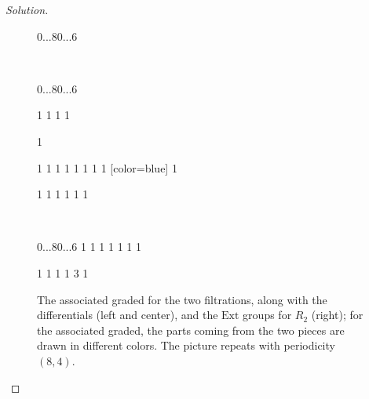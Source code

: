 \documentclass{amsart}
\newcommand{\Ext}{\mathrm{Ext}}
\begin{document}
\begin{proof}[Solution]
\begin{figure}
\begin{sseq}[entrysize=5mm, gridstroke=.05pt]{0...8}{0...6}
\ssdropbull {}\ssarrowhead
{}
\ssdropbull {}\ssarrowhead

\end{sseq}\
\begin{sseq}[entrysize=5mm, gridstroke=.05pt,ylabels=none]{0...8}{0...6}

  \ssdropbull
   1
  \ssdropbull \ssstroke[color=red]
  \ssmove 1 1
  \ssdropbull \ssstroke[color=red]
  \ssdropbull \ssstroke[color=red]
   1
  \ssdropbull {} \ssstroke[color=red]
  \ssmove 1 1
  \ssdropbull \ssstroke[color=red]

  \ssdropbull
   1
  \ssdropbull \ssstroke[color=red]

  \ssdropbull 
   1
  \ssdropbull \ssstroke[color=blue]
   1
  \ssdropbull \ssstroke[color=blue]
   1
  \ssdropbull \ssstroke[color=blue]
   1
  \ssdropbull \ssstroke[color=blue]
   1
  \ssdropbull \ssstroke[color=blue]
   1
  \ssdropbull \ssstroke[color=blue]
   1
  \ssdropbull \ssstroke[color=blue]
  \ssmove 0 1
  \ssdropbull \ssstroke[color=blue]
  [color=blue]
  \ssdropbull {}
   1
  \ssdropbull \ssstroke[color=blue]

  \ssdropbull
   1
  \ssdropbull \ssstroke[color=blue]
   1
  \ssdropbull \ssstroke[color=blue]
   1
  \ssdropbull \ssstroke[color=blue]
   1
  \ssdropbull \ssstroke[color=blue]
   1
  \ssdropbull \ssstroke[color=blue]
  \ssmove 0 1
  \ssdropbull \ssstroke[color=blue]

\ssarrowhead
{}
\ssarrowhead
{}
\ssarrowhead
{} 
\ssstroke[dashed,curve=-0.2] \ssarrowhead

  
\end{sseq}\
\begin{sseq}[entrysize=5mm, gridstroke=.05pt,ylabels=none]{0...8}{0...6}
\ssdropbull
\ssmove  1 1
\ssdropbull \ssstroke
\ssmoveto{3}{2}
\ssdropbull
{} 1
\ssdropbull \ssstroke
{} 1
\ssdropbull \ssstroke
{} 1
\ssdropbull \ssstroke
{} 1
\ssdropbull \ssstroke
{} 1
\ssdropbull \ssstroke
\ssmove  0 1
\ssdropbull \ssstroke

\ssdropbull
{} 1
\ssdropbull \ssstroke
{} 1
\ssdropbull \ssstroke
{} 1
\ssdropbull \ssstroke
\ssmove  0 1
\ssdropbull \ssstroke
{} 3
\ssdropbull
{} 1
\ssdropbull \ssstroke
\end{sseq}
\caption{The associated graded for the two filtrations, along with the
  differentials (left and center), and the $\Ext$ groups for $R_2$
  (right); for the associated graded, the parts coming from the two
  pieces are drawn in different colors. The picture repeats with
  periodicity $(8, 4)$.}
\label{fig:R2}
\end{figure}


\end{proof}
\end{document}
